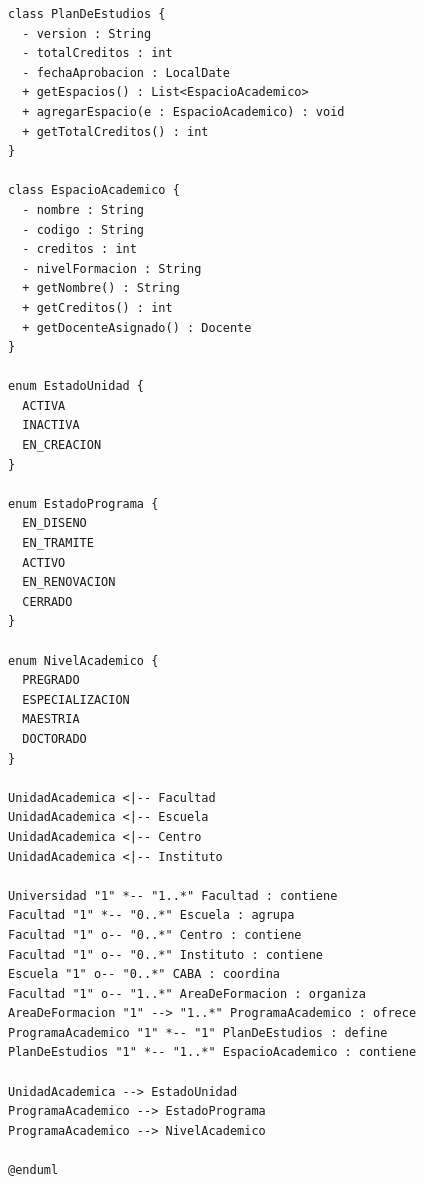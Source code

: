 \begin{lstlisting}[style=plantumlStyle,
  caption={Jerarquía completa de unidades académicas de la \ud\ (PlantUML).},
  label={lst:plantuml-clases-org}]
class PlanDeEstudios {
  - version : String
  - totalCreditos : int
  - fechaAprobacion : LocalDate
  + getEspacios() : List<EspacioAcademico>
  + agregarEspacio(e : EspacioAcademico) : void
  + getTotalCreditos() : int
}

class EspacioAcademico {
  - nombre : String
  - codigo : String
  - creditos : int
  - nivelFormacion : String
  + getNombre() : String
  + getCreditos() : int
  + getDocenteAsignado() : Docente
}

enum EstadoUnidad {
  ACTIVA
  INACTIVA
  EN_CREACION
}

enum EstadoPrograma {
  EN_DISENO
  EN_TRAMITE
  ACTIVO
  EN_RENOVACION
  CERRADO
}

enum NivelAcademico {
  PREGRADO
  ESPECIALIZACION
  MAESTRIA
  DOCTORADO
}

UnidadAcademica <|-- Facultad
UnidadAcademica <|-- Escuela
UnidadAcademica <|-- Centro
UnidadAcademica <|-- Instituto

Universidad "1" *-- "1..*" Facultad : contiene
Facultad "1" *-- "0..*" Escuela : agrupa
Facultad "1" o-- "0..*" Centro : contiene
Facultad "1" o-- "0..*" Instituto : contiene
Escuela "1" o-- "0..*" CABA : coordina
Facultad "1" o-- "1..*" AreaDeFormacion : organiza
AreaDeFormacion "1" --> "1..*" ProgramaAcademico : ofrece
ProgramaAcademico "1" *-- "1" PlanDeEstudios : define
PlanDeEstudios "1" *-- "1..*" EspacioAcademico : contiene

UnidadAcademica --> EstadoUnidad
ProgramaAcademico --> EstadoPrograma
ProgramaAcademico --> NivelAcademico

@enduml
\end{lstlisting}

